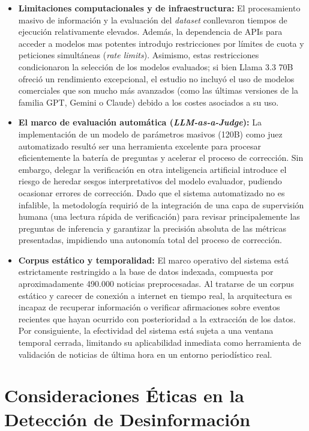 \begin{itemize}
    \item \textbf{Limitaciones computacionales y de infraestructura:} El procesamiento masivo de información y la evaluación del \textit{dataset} conllevaron tiempos de ejecución relativamente elevados. Además, la dependencia de APIs para acceder a modelos mas potentes introdujo restricciones por límites de cuota y peticiones simultáneas (\textit{rate limits}). Asimismo, estas restricciones condicionaron la selección de los modelos evaluados; si bien Llama 3.3 70B ofreció un rendimiento excepcional, el estudio no incluyó el uso de modelos comerciales que son mucho más avanzados (como las últimas versiones de la familia GPT, Gemini o Claude) debido a los costes asociados a su uso.

    \item \textbf{El marco de evaluación automática (\textit{LLM-as-a-Judge}):} La implementación de un modelo de parámetros masivos (120B) como juez automatizado resultó ser una herramienta excelente para procesar eficientemente la batería de preguntas y acelerar el proceso de corrección. Sin embargo, delegar la verificación en otra inteligencia artificial introduce el riesgo de heredar sesgos interpretativos del modelo evaluador, pudiendo ocasionar errores de corrección. Dado que el sistema automatizado no es infalible, la metodología requirió de la integración de una capa de supervisión humana (una lectura rápida de verificación) para revisar principalemente las preguntas de inferencia y garantizar la precisión absoluta de las métricas presentadas, impidiendo una autonomía total del proceso de corrección.

    \item \textbf{Corpus estático y temporalidad:} El marco operativo del sistema está estrictamente restringido a la base de datos indexada, compuesta por aproximadamente 490.000 noticias preprocesadas. Al tratarse de un corpus estático y carecer de conexión a internet en tiempo real, la arquitectura es incapaz de recuperar información o verificar afirmaciones sobre eventos recientes que hayan ocurrido con posterioridad a la extracción de los datos. Por consiguiente, la efectividad del sistema está sujeta a una ventana temporal cerrada, limitando su aplicabilidad inmediata como herramienta de validación de noticias de última hora en un entorno periodístico real.
\end{itemize}

\section{Consideraciones Éticas en la Detección de Desinformación}

